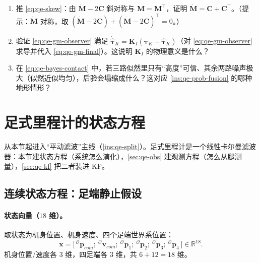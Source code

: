 \begin{practice}
\begin{enumerate}
  \item 推 \cref{eq:qe-skew}：由 $\dot{\mathbf{M}}-2\mathbf{C}$ 斜对称与 $\mathbf{M}=\mathbf{M}^\top$，证明 $\dot{\mathbf{M}}=\mathbf{C}+\mathbf{C}^\top$。（提示：$\dot{\mathbf{M}}$ 对称，取 $(\dot{\mathbf{M}}-2\mathbf{C})+(\dot{\mathbf{M}}-2\mathbf{C})^\top=0$。）
  \item 验证 \cref{eq:qe-gm-observer} 满足 $\dot{\hat{\boldsymbol\tau}}_K=\mathbf{K}_I(\boldsymbol\tau_K-\hat{\boldsymbol\tau}_K)$（对 \cref{eq:qe-gm-observer} 求导并代入 \cref{eq:qe-gm-final}）。这说明 $\mathbf{K}_I$ 的物理意义是什么？
  \item 在 \cref{eq:qe-bayes-contact} 中，若三路似然里只有“高度”可信、其余两路噪声极大（似然近似均匀），后验会塌缩成什么？这对应 \cref{ins:qe-prob-fusion} 的哪种地形情形？
\end{enumerate}
\end{practice}

\section{足式里程计的状态方程}
\label{sec:qe-state}

从本节起进入“平动滤波”主线（\cref{ins:qe-split}）。足式里程计是一个线性卡尔曼滤波器：本节建状态方程（系统怎么演化），\cref{sec:qe-obs} 建观测方程（怎么从腿测量），\cref{sec:qe-kf} 把二者装进 KF。

\subsection{连续状态方程：足端静止假设}
\label{subsec:qe-cont-state}

\paragraph{状态向量（$18$ 维）。}
取状态为机身位置、机身速度、四个足端世界系位置：
\begin{equation}
  \boldsymbol x = \big[\,{}^{\mathcal{O}}\boldsymbol p_{com};\ {}^{\mathcal{O}}\boldsymbol v_{com};\ {}^{\mathcal{O}}\boldsymbol p_{1};\ {}^{\mathcal{O}}\boldsymbol p_{2};\ {}^{\mathcal{O}}\boldsymbol p_{3};\ {}^{\mathcal{O}}\boldsymbol p_{4}\,\big]\in\mathbb{R}^{18}.
  \label{eq:qe-state-vec}
\end{equation}
机身位置/速度各 $3$ 维，四足端各 $3$ 维，共 $6+12=18$ 维\cite{yu2021quadruped,unitree2023quadruped}。

